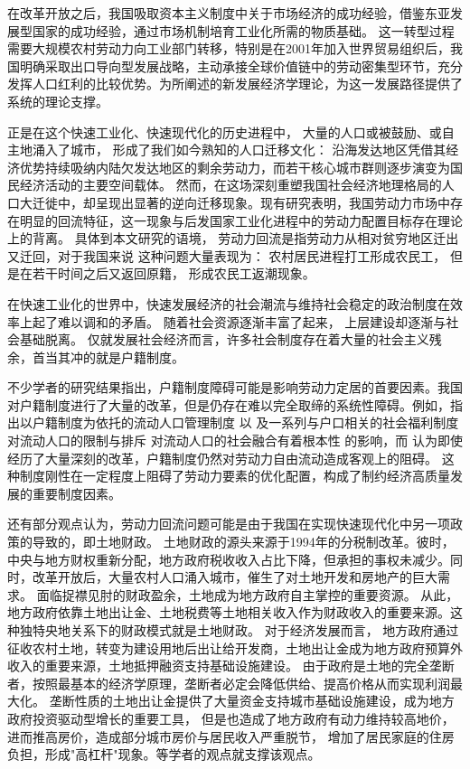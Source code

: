 \documentclass[a4paper,12pt,oneside, fontset=mac]{ctexbook} %
\begin{document}
在改革开放之后，我国吸取资本主义制度中关于市场经济的成功经验，借鉴东亚发展型国家的成功经验，通过市场机制培育工业化所需的物质基础。
这一转型过程需要大规模农村劳动力向工业部门转移，特别是在2001年加入世界贸易组织后，我国明确采取出口导向型发展战略，主动承接全球价值链中的劳动密集型环节，充分发挥人口红利的比较优势。\cite{LinYiFuZhongGuoDeJingJiFaZhanZhanLueYuDiQuShouRuChaiJu2003}为所阐述的新发展经济学理论，为这一发展路径提供了系统的理论支撑。

正是在这个快速工业化、快速现代化的历史进程中，
大量的人口或被鼓励、或自主地涌入了城市，
形成了我们如今熟知的人口迁移文化：
沿海发达地区凭借其经济优势持续吸纳内陆欠发达地区的剩余劳动力，而若干核心城市群则逐步演变为国民经济活动的主要空间载体。
然而，在这场深刻重塑我国社会经济地理格局的人口大迁徙中，却呈现出显著的逆向迁移现象。现有研究表明，我国劳动力市场中存在明显的回流特征，这一现象与后发国家工业化进程中的劳动力配置目标存在理论上的背离。
具体到本文研究的语境，
劳动力回流是指劳动力从相对贫穷地区迁出又迁回，对于我国来说
这种问题大量表现为：
农村居民进程打工形成农民工，
但是在若干时间之后又返回原籍，
形成农民工返潮现象。

在快速工业化的世界中，快速发展经济的社会潮流与维持社会稳定的政治制度在效率上起了难以调和的矛盾。
随着社会资源逐渐丰富了起来，
上层建设却逐渐与社会基础脱离。
仅就发展社会经济而言，许多社会制度存在着大量的社会主义残余，首当其冲的就是户籍制度。

不少学者的研究结果指出，户籍制度障碍可能是影响劳动力定居的首要因素。我国对户籍制度进行了大量的改革，但是仍存在难以完全取缔的系统性障碍。例如，\cite{RenYuanChengShiLiuDongRenKouDeSheHuiRongHeWenXianShuPing2006}指出以户籍制度为依托的流动人口管理制度 以 及一系列与户口相关的社会福利制度对流动人口的限制与排斥 对流动人口的社会融合有着根本性 的影响，而
\cite{LuYiLongHuKouHuanQiZuoYongMaHuJiZhiDuYuSheHuiFenCengHeLiuDong2008}认为即使经历了大量深刻的改革，户籍制度仍然对劳动力自由流动造成客观上的阻碍。
这种制度刚性在一定程度上阻碍了劳动力要素的优化配置，构成了制约经济高质量发展的重要制度因素。

还有部分观点认为，劳动力回流问题可能是由于我国在实现快速现代化中另一项政策的导致的，即土地财政。
土地财政的源头来源于1994年的分税制改革。彼时，中央与地方财权重新分配，地方政府税收收入占比下降，但承担的事权未减少。同时，改革开放后，大量农村人口涌入城市，催生了对土地开发和房地产的巨大需求。
面临捉襟见肘的财政盈余，土地成为地方政府自主掌控的重要资源。
从此，地方政府依靠土地出让金、土地税费等土地相关收入作为财政收入的重要来源。这种独特央地关系下的财政模式就是土地财政。
对于经济发展而言，
地方政府通过征收农村土地，转变为建设用地后出让给开发商，土地出让金成为地方政府预算外收入的重要来源，土地抵押融资支持基础设施建设。
由于政府是土地的完全垄断者，按照最基本的经济学原理，垄断者必定会降低供给、提高价格从而实现利润最大化。
垄断性质的土地出让金提供了大量资金支持城市基础设施建设，成为地方政府投资驱动型增长的重要工具，
但是也造成了地方政府有动力维持较高地价，进而推高房价，造成部分城市房价与居民收入严重脱节，
增加了居民家庭的住房负担，形成"高杠杆"现象。\cite{ChenYingFangNongMinGongZhiDuAnPaiYuShenFenRenTong2005,niehuihuaZhongguogaofangjiadexinzhengzhijingjixuejieshiYiZhengqihemou2013,YuJianXingDiFangFaZhanXingZhengFuDeXingWeiLuoJiJiZhiDuJiChu2012}等学者的观点就支撑该观点。
\end{document}
